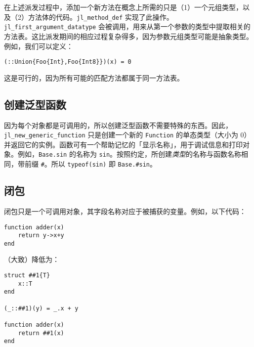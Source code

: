 在上述派发过程中，添加一个新方法在概念上所需的只是（1）一个元组类型，以及（2）方法体的代码。\texttt{jl\_method\_def} 实现了此操作。\texttt{jl\_first\_argument\_datatype} 会被调用，用来从第一个参数的类型中提取相关的方法表。这比派发期间的相应过程复杂得多，因为参数元组类型可能是抽象类型。例如，我们可以定义：




\begin{verbatim}
(::Union{Foo{Int},Foo{Int8}})(x) = 0
\end{verbatim}



这是可行的，因为所有可能的匹配方法都属于同一方法表。



\hypertarget{4974882052749632871}{}


\subsection{创建泛型函数}



因为每个对象都是可调用的，所以创建泛型函数不需要特殊的东西。因此，\texttt{jl\_new\_generic\_function} 只是创建一个新的 \texttt{Function} 的单态类型（大小为 0）并返回它的实例。函数可有一个帮助记忆的「显示名称」，用于调试信息和打印对象。例如，\texttt{Base.sin} 的名称为 \texttt{sin}。按照约定，所创建\emph{类型}的名称与函数名称相同，带前缀 \texttt{\#}。所以 \texttt{typeof(sin)} 即 \texttt{Base.\#sin}。



\hypertarget{2172965036514898807}{}


\subsection{闭包}



闭包只是一个可调用对象，其字段名称对应于被捕获的变量。例如，以下代码：




\begin{verbatim}
function adder(x)
    return y->x+y
end
\end{verbatim}



（大致）降低为：




\begin{verbatim}
struct ##1{T}
    x::T
end

(_::##1)(y) = _.x + y

function adder(x)
    return ##1(x)
end
\end{verbatim}



